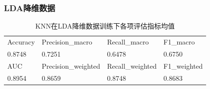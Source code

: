 \documentclass[10pt]{article}
\begin{document}
\subsubsection*{LDA降维数据}
\begin{table}[H]
  \centering
  \caption{KNN在LDA降维数据训练下各项评估指标均值}
  \begin{tabular}{llll}
  \toprule
  Accuracy & Precision\_macro & Recall\_macro & F1\_macro \\
  0.8748 & 0.7251 & 0.6478 & 0.6750 \\
  \midrule
  AUC & Precision\_weighted & Recall\_weighted & F1\_weighted \\
  0.8954 & 0.8659 & 0.8748 & 0.8683 \\
  \bottomrule
  \end{tabular}
\end{table}
\end{document}
